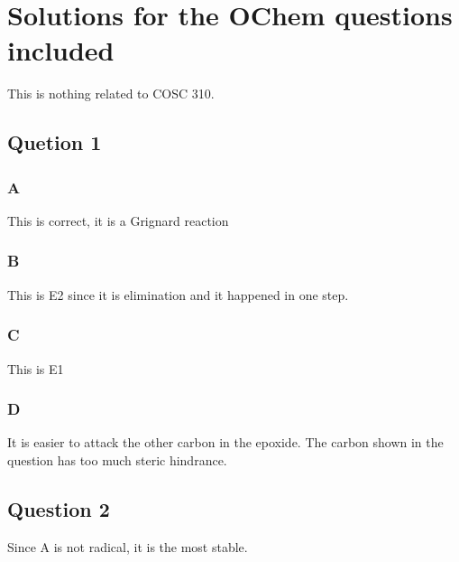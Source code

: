 \documentclass{article}
\begin{document}
\section{Solutions for the OChem questions included}
This is nothing related to COSC 310.
\subsection{Quetion 1}
\subsubsection*{A}
This is correct, it is a Grignard reaction
\subsubsection*{B}
This is E2 since it is elimination and it happened in one step.
\subsubsection*{C}
This is E1
\subsubsection*{D}
It is easier to attack the other carbon in the epoxide. The carbon shown in the question has too much steric hindrance.
\subsection{Question 2}
Since A is not radical, it is the most stable.
\end{document}
